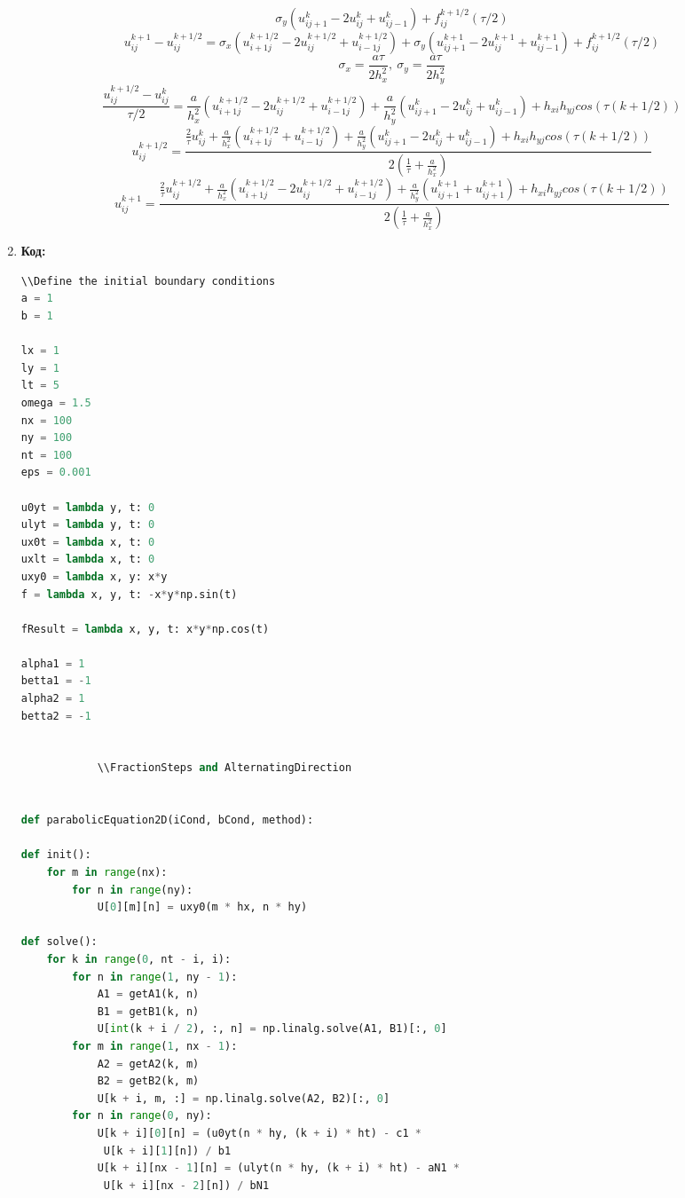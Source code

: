 \documentclass[12pt]{article}
\begin{document}
\begin{enumerate}
$$        \sigma_y(u^{k}_{i j+1} - 2u^{k}_{i j} + u^{k}_{i j-1}) + f^{k+1/2}_{ij}(\tau/2)$$
        $$u^{k+1}_{ij} - u^{k+1/2}_{ij}= \sigma_x(u^{k+1/2}_{i+1 j}-2u^{k+1/2}_{i j} +u^{k+1/2}_{i-1 j})+
        \sigma_y(u^{k+1}_{i j+1} - 2u^{k+1}_{i j} + u^{k+1}_{i j-1}) + f^{k+1/2}_{ij}(\tau/2)$$
        $$\sigma_x = \frac{a\tau}{2h^2_x},~\sigma_y = \frac{a\tau}{2h^2_y}$$
        $$\frac{u^{k+1/2}_{ij} - u^k_{ij}}{\tau/2}= \frac{a}{h_x^2}(u^{k+1/2}_{i+1 j}-2u^{k+1/2}_{i j} +u^{k+1/2}_{i-1 j})+
        \frac{a}{h_y^2}(u^{k}_{i j+1} - 2u^{k}_{i j} + u^{k}_{i j-1}) + h_{xi}h_{yj} cos(\tau(k+1/2))$$
        $$u_{ij}^{k+1/2} = \frac{\frac{2}{\tau} u_{ij}^{k} + \frac{a}{h_x^2} (u_{i+1 j}^{k+1/2}+u_{i-1 j}^{k+1/2})
        + \frac{a}{h_y^2} (u_{ij+1}^k -2u_{ij}^k+u_{ij-1}^k )+h_{xi}h_{yj}cos(\tau(k+1/2)) 
        }{2\left(\frac{1}{\tau} + \frac{a}{h_x^2}\right)}$$
        $$u_{ij}^{k+1} = \frac{\frac{2}{\tau} u_{ij}^{k +1/2} + \frac{a}{h_x^2} (u_{i+1j}^{k+1/2} -2u_{ij}^{k+1/2}+u_{i-1j}^{k+1/2})
        + \frac{a}{h_y^2} (u_{i j+1}^{k+1}+u_{i j+1}^{k+1} )+h_{xi}h_{yj}cos(\tau(k+1/2)) 
        }{2\left(\frac{1}{\tau} + \frac{a}{h_x^2}\right)}$$

        
        \item \textbf{Код:}\\
        \begin{lstlisting}[language=python]
            \\Define the initial boundary conditions
a = 1
b = 1

lx = 1
ly = 1
lt = 5
omega = 1.5
nx = 100
ny = 100
nt = 100
eps = 0.001

u0yt = lambda y, t: 0
ulyt = lambda y, t: 0
ux0t = lambda x, t: 0
uxlt = lambda x, t: 0
uxy0 = lambda x, y: x*y
f = lambda x, y, t: -x*y*np.sin(t)

fResult = lambda x, y, t: x*y*np.cos(t)

alpha1 = 1
betta1 = -1
alpha2 = 1
betta2 = -1


            \\FractionSteps and AlternatingDirection


def parabolicEquation2D(iCond, bCond, method):

def init():
    for m in range(nx):
        for n in range(ny):
            U[0][m][n] = uxy0(m * hx, n * hy)

def solve():
    for k in range(0, nt - i, i):
        for n in range(1, ny - 1):
            A1 = getA1(k, n)
            B1 = getB1(k, n)
            U[int(k + i / 2), :, n] = np.linalg.solve(A1, B1)[:, 0]
        for m in range(1, nx - 1):
            A2 = getA2(k, m)
            B2 = getB2(k, m)
            U[k + i, m, :] = np.linalg.solve(A2, B2)[:, 0]
        for n in range(0, ny):
            U[k + i][0][n] = (u0yt(n * hy, (k + i) * ht) - c1 * 
             U[k + i][1][n]) / b1
            U[k + i][nx - 1][n] = (ulyt(n * hy, (k + i) * ht) - aN1 *
             U[k + i][nx - 2][n]) / bN1


\end{lstlisting}
\end{enumerate}
\end{document}
